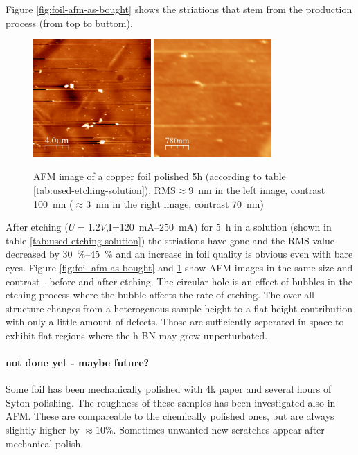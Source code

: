 Figure \ref{fig:foil-afm-as-bought} shows the striations that stem from the production process (from top to buttom).
\begin{figure}[h]
 \centering
 \includegraphics[width=0.4\textwidth]{./images/polished0000.jpg}
 \includegraphics[width=0.4\textwidth]{./images/polished0001.jpg}
 \caption{AFM image of a copper foil polished 5h (according to table \ref{tab:used-etching-solution}), RMS$\approx$\SI{9}{\nm} in the left image, contrast \SI{100}{\nm} ($\approx$\SI{3}{\nm} in the right image, contrast \SI{70}{\nm})}
 \label{fig:foil-afm-polished}
\end{figure}
After etching ($U=1.2V$,I=\SIrange{120}{250}{\mA}) for \SI{5}{\hour} in a solution (shown in table \ref{tab:used-etching-solution}) the striations have gone and the RMS value decreased by \SIrange{30}{45}{\percent} and an increase in foil quality is obvious even with bare eyes. Figure \ref{fig:foil-afm-as-bought} and \ref{fig:foil-afm-polished} show AFM images in the same size and contrast - before and after etching.
The circular hole is an effect of bubbles in the etching process where the bubble affects the rate of etching. The over all structure changes from a heterogenous sample height to a flat height contribution with only a little amount of defects. Those are sufficiently seperated in space to exhibit flat regions where the h-BN may grow unperturbated.



\paragraph{not done yet - maybe future?}
Some foil has been mechanically polished with 4k paper and several hours of Syton polishing. The roughness of these samples has been investigated also in AFM. These are compareable to the chemically polished ones, but are always slightly higher by $\approx 10\%$. Sometimes unwanted new scratches appear after mechanical polish.

